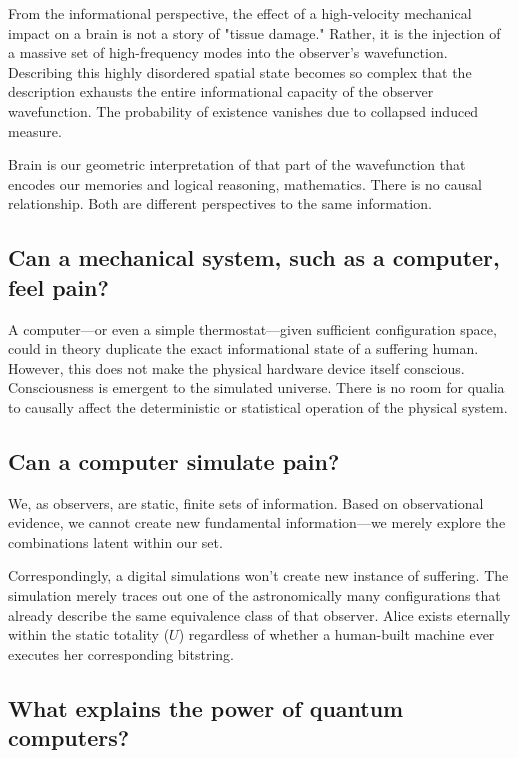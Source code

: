 From the informational perspective, the effect of a high-velocity mechanical impact on a brain is not a story of "tissue damage."
Rather, it is the injection of a massive set of high-frequency modes into the observer's wavefunction.
Describing this highly disordered spatial state becomes so complex that the description exhausts the entire informational capacity of the observer wavefunction. 
The probability of existence vanishes due to collapsed induced measure.

Brain is our geometric interpretation of that part of the wavefunction that encodes our memories and logical reasoning, mathematics.
There is no causal relationship. Both are different perspectives to the same information.


\subsection*{Can a mechanical system, such as a computer, feel pain?}

A computer—or even a simple thermostat—given sufficient configuration space, could in theory duplicate the exact informational state of a suffering human.
However, this does not make the physical hardware device itself conscious. Consciousness is emergent to the simulated universe. 
There is no room for qualia to causally affect the deterministic or statistical operation of the physical system.


\subsection*{Can a computer simulate pain?}

We, as observers, are static, finite sets of information.
Based on observational evidence, we cannot create new fundamental information—we merely explore the combinations latent within our set. 

Correspondingly, a digital simulations won't create new instance of suffering.
The simulation merely traces out one of the astronomically many configurations that already describe the same equivalence class of that observer.
Alice exists eternally within the static totality ($U$) regardless of whether a human-built machine ever executes her corresponding bitstring.


\subsection*{What explains the power of quantum computers?}

